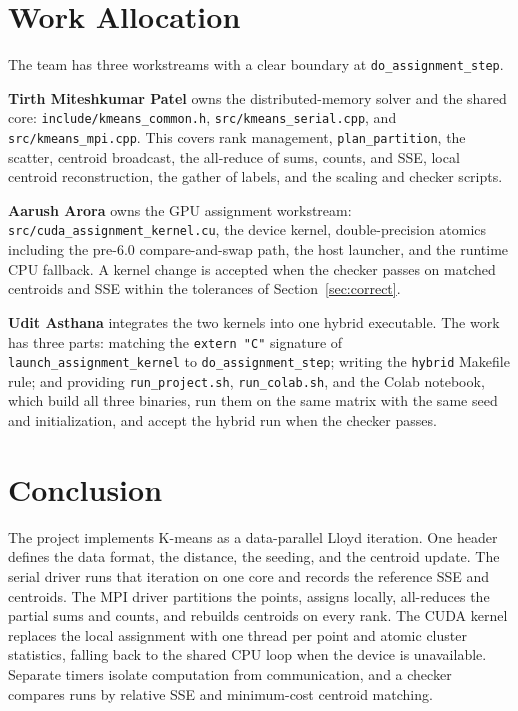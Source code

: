 \documentclass[12pt,a4paper]{article}
\DeclareRobustCommand{\code}[1]{\texttt{#1}}
\DeclareRobustCommand{\file}[1]{\texttt{#1}}
\begin{document}
\section{Work Allocation}
\label{sec:work}

The team has three workstreams with a clear boundary at \code{do\_assignment\_step}.

\textbf{Tirth Miteshkumar Patel} owns the distributed-memory solver and the shared core: \file{include/kmeans\_common.h}, \file{src/kmeans\_serial.cpp}, and \file{src/kmeans\_mpi.cpp}. This covers rank management, \code{plan\_partition}, the scatter, centroid broadcast, the all-reduce of sums, counts, and SSE, local centroid reconstruction, the gather of labels, and the scaling and checker scripts.

\textbf{Aarush Arora} owns the GPU assignment workstream: \file{src/cuda\_assignment\_kernel.cu}, the device kernel, double-precision atomics including the pre-6.0 compare-and-swap path, the host launcher, and the runtime CPU fallback. A kernel change is accepted when the checker passes on matched centroids and SSE within the tolerances of Section~\ref{sec:correct}.

\textbf{Udit Asthana} integrates the two kernels into one hybrid executable. The work has three parts: matching the \code{extern "C"} signature of \code{launch\_assignment\_kernel} to \code{do\_assignment\_step}; writing the \code{hybrid} Makefile rule; and providing \file{run\_project.sh}, \file{run\_colab.sh}, and the Colab notebook, which build all three binaries, run them on the same matrix with the same seed and initialization, and accept the hybrid run when the checker passes.

\section{Conclusion}
\label{sec:conclusion}

The project implements K-means as a data-parallel Lloyd iteration. One header defines the data format, the distance, the seeding, and the centroid update. The serial driver runs that iteration on one core and records the reference SSE and centroids. The MPI driver partitions the points, assigns locally, all-reduces the partial sums and counts, and rebuilds centroids on every rank. The CUDA kernel replaces the local assignment with one thread per point and atomic cluster statistics, falling back to the shared CPU loop when the device is unavailable. Separate timers isolate computation from communication, and a checker compares runs by relative SSE and minimum-cost centroid matching.
\end{document}
